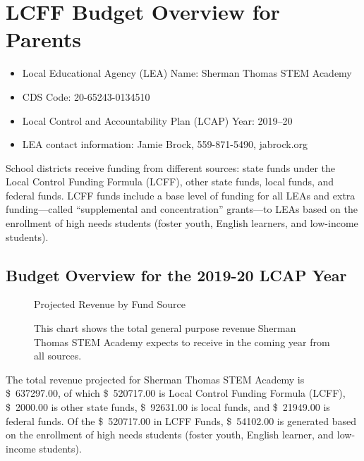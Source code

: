 \documentclass{article}
\newcommand{\pieslicecaption}[3]{{#1, \dollar{#2}, \SI{#3}{\percent}}}
\newcommand{\dollar}[1]{\SI{#1}[\$]{}}
\begin{document}
\section{LCFF Budget Overview for Parents}
\begin{itemize}[noitemsep,label={}]
\item Local Educational Agency (LEA) Name: Sherman Thomas STEM Academy
\item CDS Code: 20-65243-0134510
\item Local Control and Accountability Plan (LCAP) Year: 2019--20
\item LEA contact information: Jamie Brock, 559-871-5490, jabrock\@stcsca.org
\end{itemize}

School districts receive funding from different sources: state funds under the Local Control Funding Formula (LCFF), other state funds, local funds, and federal funds. LCFF funds include a base level of funding for all LEAs and extra funding---called ``supplemental and concentration'' grants---to LEAs based on the enrollment of high needs students (foster youth, English learners, and low-income students).

\subsection{Budget Overview for the 2019-20 LCAP Year}
\begin{figure}[hbtp]
\centering
Projected Revenue by Fund Source
	\caption*{This chart shows the total general purpose revenue Sherman Thomas STEM Academy expects to receive in the coming year from all sources.}
\end{figure}

The total revenue projected for Sherman Thomas STEM Academy is \dollar{637297.00}, of which \dollar{520717.00} is Local Control Funding Formula (LCFF), \dollar{2000.00} is other state funds, \dollar{92631.00} is local funds, and \dollar{21949.00} is federal funds. Of the \dollar{520717.00} in LCFF Funds, \dollar{54102.00} is generated based on the enrollment of high needs students (foster youth, English learner, and low-income students).
\end{document}
